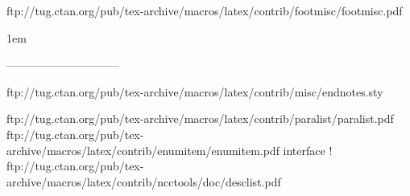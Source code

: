 %
ftp://tug.ctan.org/pub/tex-archive/macros/latex/contrib/footmisc/footmisc.pdf
%
\usepackage[
bottom, %
stable, %
perpage, %
ragged, %
multiple, %
]{footmisc}

\renewcommand*{\multfootsep}{,\nobreakspace}

{1em}%
{\textsubscript{\thefootnotemark}}%



------------------------------

ftp://tug.ctan.org/pub/tex-archive/macros/latex/contrib/misc/endnotes.sty
%
%
%
%

%
\usepackage[ngerman]{varioref} %

%
%
ftp://tug.ctan.org/pub/tex-archive/macros/latex/contrib/paralist/paralist.pdf
%
ftp://tug.ctan.org/pub/tex-archive/macros/latex/contrib/enumitem/enumitem.pdf
interface !
%
ftp://tug.ctan.org/pub/tex-archive/macros/latex/contrib/ncctools/doc/desclist.pdf


